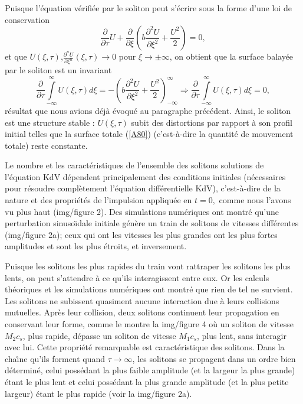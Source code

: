 \documentclass[10pt,thmsa]{article}
\begin{document}
Puisque l'\'{e}quation v\'{e}rifi\'{e}e par le soliton peut s'\'{e}crire sous
la forme d'une loi de conservation
\begin{equation}
\frac{\partial}{\partial\tau}U+\frac{\partial}{\partial\xi}\left(
b\frac{\partial^{2}U}{\partial\xi^{2}}+\frac{U^{2}}{2}\right)  =0,\label{A78}%
\end{equation}
et que $U(\xi,\tau)$,$\frac{\partial^{n}U}{\partial\xi^{n}}(\xi,\tau
)\rightarrow0$ pour $\xi\rightarrow\pm\infty$, on obtient que la surface
balay\'{e}e par le soliton est un invariant
\begin{equation}
\frac{\partial}{\partial\tau}\underset{-\infty}{\overset{\infty}{\int}}%
U(\xi,\tau)d\xi=-\left(  b\frac{\partial^{2}U}{\partial\xi^{2}}+\frac{U^{2}%
}{2}\right)  _{-\infty}^{\infty}\Rightarrow\frac{\partial}{\partial\tau
}\underset{-\infty}{\overset{\infty}{\int}}U(\xi,\tau)d\xi=0,\label{A80}%
\end{equation}
r\'{e}sultat que nous avions d\'{e}j\`{a} \'{e}voqu\'{e} au paragraphe
pr\'{e}c\'{e}dent. Ainsi, le soliton est une structure stable : $U(\xi,\tau)$
subit des distortions par rapport \`{a} son profil initial telles que la
surface totale (\ref{A80}) (c'est-\`{a}-dire la quantit\'{e} de mouvement
totale) reste constante.

Le nombre et les caract\'{e}ristiques de l'ensemble des solitons solutions de
l'\'{e}quation KdV d\'{e}pendent principalement des conditions initiales
(n\'{e}cessaires pour r\'{e}soudre compl\`{e}tement l'\'{e}quation
diff\'{e}rentielle KdV), c'est-\`{a}-dire de la nature et des
propri\'{e}t\'{e}s de l'impulsion appliqu\'{e}e en $t=0,$ comme nous l'avons
vu plus haut (img/figure 2). Des simulations num\'{e}riques ont montr\'{e} qu'une
perturbation sinuso\"{\i}dale initiale g\'{e}n\`{e}re un train de solitons de
vitesses diff\'{e}rentes (img/figure 2a); ceux qui ont les vitesses les plus
grandes ont les plus fortes amplitudes et sont les plus \'{e}troits, et inversement.

Puisque les solitons les plus rapides du train vont rattraper les solitons les
plus lents, on peut s'attendre \`{a} ce qu'ils interagissent entre eux. Or les
calculs th\'{e}oriques et les simulations num\'{e}riques ont montr\'{e} que
rien de tel ne survient. Les solitons ne subissent quasiment aucune
interaction due \`{a} leurs collisions mutuelles. Apr\`{e}s leur collision,
deux solitons continuent leur propagation en conservant leur forme, comme le
montre la img/figure 4 o\`{u} un soliton de vitesse $M_{2}c_{s}$, plus rapide,
d\'{e}passe un soliton de vitesse $M_{1}c_{s}$, plus lent, sans interagir avec
lui. Cette propri\'{e}t\'{e} remarquable est caract\'{e}ristique des solitons.
Dans la cha\^{\i}ne qu'ils forment quand $\tau\rightarrow\infty$, les solitons
se propagent dans un ordre bien d\'{e}termin\'{e}, celui poss\'{e}dant la plus
faible amplitude (et la largeur la plus grande) \'{e}tant le plus lent et
celui poss\'{e}dant la plus grande amplitude (et la plus petite largeur)
\'{e}tant le plus rapide (voir la img/figure 2a).
\end{document}
